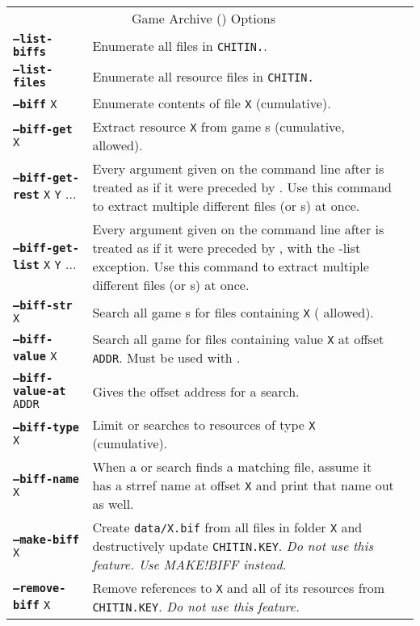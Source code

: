\documentclass{article}
\def\ttref#1{\ahrefloc{#1}{\tt #1}}
\def\DEFINE#1{{\tt \bf #1}\label{#1}\index{#1}}
\def\t#1{{\tt #1}}
\begin{document}
\begin{tabular}{lp{10in}|p{10in}}
\\
\multicolumn{2}{c}{ \color{red} Game Archive (\ttref{BIFF}) Options} \\
\DEFINE{--list-biffs}&	Enumerate all \ttref{BIFF} files in \t{CHITIN.}\ttref{KEY}. \\
\DEFINE{--list-files}&	Enumerate all resource files in \t{CHITIN.}\ttref{KEY} \\
\DEFINE{--biff} \t{X} & Enumerate contents of \ttref{BIFF} file \t{X} (cumulative). \\
\DEFINE{--biff-get} \t{X}&	Extract resource \t{X} from game \ttref{BIFF}s (cumulative, \ttref{regexp} allowed). \\
\DEFINE{--biff-get-rest} \t{X} \t{Y} ... & Every argument given on the
command line after \ttref{--biff-get-rest} is treated as if it were
preceded by \ttref{--biff-get}. Use this command to extract multiple
different files (or \ttref{regexp}s) at once. \\
\DEFINE{--biff-get-list} \t{X} \t{Y} ... & Every argument given on the
command line after \ttref{--biff-get-rest} is treated as if it were
preceded by \ttref{--biff-get}, with the -list exception. Use this command to extract multiple
different files (or \ttref{regexp}s) at once. \\
\DEFINE{--biff-str} \t{X}&	Search all game \ttref{BIFF}s for files
containing \t{X} (\ttref{regexp} allowed). \\
\DEFINE{--biff-value} \t{X} &   Search all game \ttref{BIFFs} for files
containing value \t{X} at offset \t{ADDR}. Must be used with
\ttref{--biff-value-at}. \\
\DEFINE{--biff-value-at} \t{ADDR} & Gives the offset address for a
\ttref{--biff-value} search. \\
\DEFINE{--biff-type} \t{X}&	Limit \ttref{--biff-str} or
\ttref{--biff-value} searches to
resources of type \t{X} (cumulative). \\
\DEFINE{--biff-name} \t{X}&	When a \ttref{--biff-str} or
\ttref{--biff-value} search finds a
matching file, assume it has a strref name at offset \t{X} and print that
name out as well. \\
\DEFINE{--make-biff} \t{X} & Create \t{data/X.bif} from all files in
folder \t{X} and destructively update \t{CHITIN.KEY}. \emph{Do not use this
feature. Use MAKE!BIFF instead.} \\
\DEFINE{--remove-biff} \t{X} & Remove references to \ttref{BIFF} \t{X} and
all of its resources from \t{CHITIN.KEY}. \emph{Do not use this feature.} \\

\end{tabular}
\end{document}

